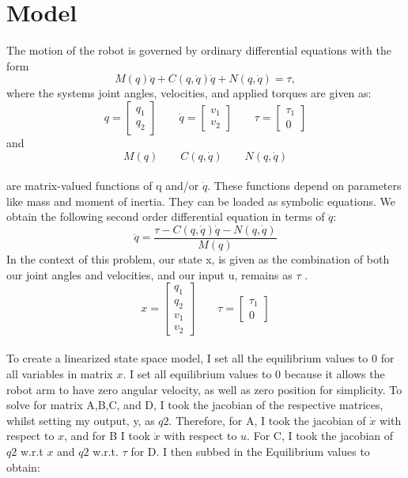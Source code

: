 \documentclass[12pt]{article}
\begin{document}
\section{Model}
The motion of the robot is governed by ordinary differential equations with the form
\begin{equation}
\label{eqEOM}
M(q) \ddot{q} + C(q,\dot{q})\dot{q} + N(q,\dot{q}) = \tau,
\end{equation}
where the systems joint angles, velocities, and applied torques are given as:
\begin{equation*}
q = \begin{bmatrix} q_{1} \\ q_{2} \end{bmatrix} \qquad \dot{q} = \begin{bmatrix} v_{1} \\ v_{2} \end{bmatrix} \qquad \tau = \begin{bmatrix} \tau_{1} \\ 0 \end{bmatrix}
\end{equation*}
and
\begin{equation*}
M(q) \qquad C(q,\dot{q}) \qquad N(q,\dot{q})
\end{equation*}\\
are matrix-valued functions of q and/or $\dot{q}$. These functions depend on parameters like mass and moment of inertia. They can be loaded as symbolic equations. We obtain the following second order differential equation in terms of $\ddot{q}$:
\begin{equation*}
\label{eqODE}
    \ddot{q} = \frac{\tau-C(q,\dot{q})\dot{q}-N(q,\dot{q})}{M(q)}
\end{equation*}
In the context of this problem, our state x, is given as the combination of both our joint angles and velocities, and our input u, remains as $\tau$ .
\begin{equation*}
    x = \begin{bmatrix} q_{1} \\ q_{2} \\ v_{1} \\ v_{2}
    \end{bmatrix} \qquad \tau = \begin{bmatrix} \tau_{1} \\ 0 \end{bmatrix}
\end{equation*}\\
To create a linearized state space model, I set all the equilibrium values to 0 for all variables in matrix $x$. I set all equilibrium values to 0 because it allows the robot arm to have zero angular velocity, as well as zero position for simplicity. To solve for matrix A,B,C, and D, I took the jacobian of the respective matrices, whilst setting my output, y, as $q2$. Therefore, for A, I took the jacobian of $\dot{x}$ with respect to $x$, and for B I took $\dot{x}$ with respect to $u$. For C, I took the jacobian of $q2$ w.r.t $x$ and $q2$ w.r.t. $\tau$ for D.  I then subbed in the Equilibrium values to obtain:
\end{document}
